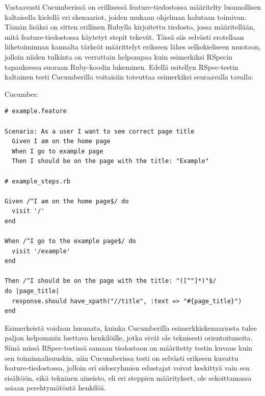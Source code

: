 \documentclass[finnish,nonumbib,nocopyright]{gradu2}
\begin{document}
Vastaavasti Cucumberissä on erillisessä feature-tiedostossa määritelty luonnollisen kaltaisella kielellä eri skenaariot, joiden mukaan ohjelman halutaan toimivan. Tämän lisäksi on sitten erillinen Rubylla kirjoitettu tiedosto, jossa määritellään, mitä feature-tiedostossa käytetyt stepit tekevät. Tässä siis selvästi erotellaan liiketoiminnan kannalta tärkeät määrittelyt erikseen lähes selkokieliseen muotoon, jolloin niiden tulkinta on verrattain helpompaa kuin esimerkiksi RSpecin tapauksessa suoraan Ruby-koodin lukeminen. Edellä esitellyn RSpec-testin kaltainen testi Cucumberilla voitaisiin toteuttaa esimerkiksi seuraavalla tavalla:

Cucumber:
\begin{verbatim}
# example.feature

Scenario: As a user I want to see correct page title
  Given I am on the home page
  When I go to example page
  Then I should be on the page with the title: "Example" 

# example_steps.rb

Given /^I am on the home page$/ do
  visit '/'
end

When /^I go to the example page$/ do
  visit '/example'
end

Then /^I should be on the page with the title: "([^"]*)"$/
do |page_title|
  response.should have_xpath("//title", :text => "#{page_title}")
end
\end{verbatim}

Esimerkeistä voidaan huomata, kuinka Cucumberilla esimerkkiskenaariosta tulee paljon helpommin luettava henkilöille, jotka eivät ole teknisesti orientoituneita. Siinä missä RSpec-testissä samaan tiedostoon on määritetty testin kuvaus kuin sen toiminnalisuuskin, niin Cucumberissa testi on selvästi erikseen kuvattu feature-tiedostossa, jolloin eri sidosryhmien edustajat voivat keskittyä vain sen sisältöön, eikä tekninen aineisto, eli eri steppien määritykset, ole sekoittamassa asiaan perehtymätöntä henkilöä.
\end{document}
